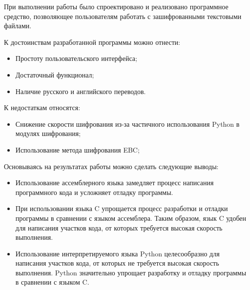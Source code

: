 \newpage
{}

При выполнении работы было спроектировано и реализовано программное средство,
позволяющее пользователям работать с зашифрованными текстовыми файлами.

К достоинствам разработанной программы можно отнести:
\begin{itemize}
  \item Простоту пользовательского интерфейса;
  \item Достаточный функционал;
  \item Наличие русского и английского переводов.
\end{itemize}

К недостаткам относятся:
\begin{itemize}
  \item Снижение скорости шифрования из-за частичного использования
  Python в модулях шифрования;
  \item Использование метода шифрования EBC;
\end{itemize}

Основываясь на результатах работы можно сделать следующие выводы:
\begin{itemize}
  \item Использование ассемблерного языка замедляет процесс написания
  программного кода и усложняет отладку программы.
  \item При использовании языка C упрощается процесс разработки и отладки
  программы в сравнении с языком ассемблера. Таким образом, язык C удобен
  для написания участков кода, от которых требуется высокая
  скорость выполнения.
  \item Использование интерпретируемого языка Python целесообразно для
  написания участков кода, от которых не требуется высокая скорость выполнения.
  Python значительно упрощает разработку и отладку программы в сравнении
  с языком C.
\end{itemize}
